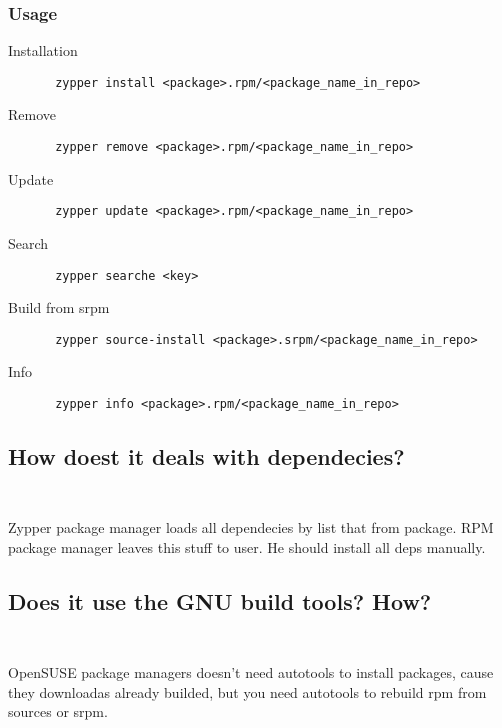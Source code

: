 \documentclass[10pt]{article}
\begin{document}
        \subsubsection{Usage}
        \begin{description}
            \item[Installation] \begin{verbatim} zypper install <package>.rpm/<package_name_in_repo> \end{verbatim}
            \item[Remove] \begin{verbatim} zypper remove <package>.rpm/<package_name_in_repo> \end{verbatim}
            \item[Update] \begin{verbatim} zypper update <package>.rpm/<package_name_in_repo> \end{verbatim}
            \item[Search] \begin{verbatim} zypper searche <key> \end{verbatim}
            \item[Build from srpm] \begin{verbatim} zypper source-install <package>.srpm/<package_name_in_repo> \end{verbatim}
            \item[Info] \begin{verbatim} zypper info <package>.rpm/<package_name_in_repo> \end{verbatim}
        \end{description} 


    \subsection {How doest it deals with dependecies?\\ \\}
    Zypper package manager loads all dependecies by list that from package.
    RPM package manager leaves this stuff to user. He should install all deps manually. \newline \newline

    \subsection {Does it use the GNU build tools? How? \\ \\ }
    OpenSUSE package managers doesn't need autotools to install packages, cause they downloadas already builded, but you need autotools to rebuild rpm from sources or srpm.
\end{document}
